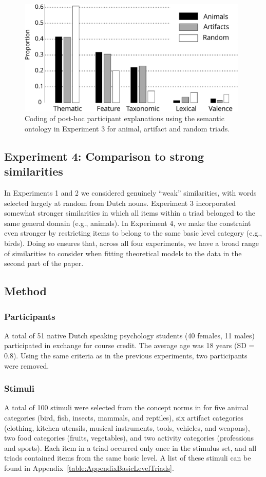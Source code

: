 \documentclass[doc]{apa6}
\begin{document}
\begin{figure}
\centering
\includegraphics[width=11cm]{images/Exp4SemanticCodingSplitByType.pdf}
\caption{\small{Coding of post-hoc participant explanations using the semantic ontology in Experiment 3 for animal, artifact and random triads.}}
\label{fig:SemanticCoding}
\end{figure}


\subsection{Experiment 4: Comparison to strong similarities}

In Experiments 1 and 2 we considered genuinely ``weak'' similarities, with words selected largely at random from Dutch nouns. Experiment 3 incorporated somewhat stronger similarities in which all items within a triad belonged to the same general domain (e.g., animals). In Experiment 4, we make the constraint even stronger by restricting items to belong to the same basic level category (e.g., birds). Doing so ensures that, across all four experiments, we have a broad range of similarities to consider when fitting theoretical models to the data in the second part of the paper.


\subsection{Method}
\subsubsection{Participants} A total of 51 native Dutch speaking psychology students (40 females, 11 males) participated in exchange for course credit. The average age was 18 years (SD = 0.8). Using the same criteria as in the previous experiments, two participants were removed.

\subsubsection{Stimuli}
A total of 100 stimuli were selected from the concept norms in \textcite{DeDeyne2008} for five animal categories (bird, fish, insects, mammals, and reptiles), six artifact categories (clothing, kitchen utensils, musical instruments, tools, vehicles, and weapons), two food categories (fruits, vegetables), and two activity categories (professions and sports). Each item in a triad occurred only once in the stimulus set, and all triads contained items from the same basic level.  A list of these stimuli can be found in Appendix~\ref{table:AppendixBasicLevelTriads}.
\end{document}
